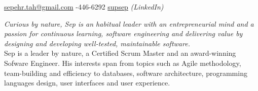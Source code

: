 \documentclass[10pt,a4paper]{article}
\begin{document}
\sloppy  %


\nobreakvspace{0.3em}  %

\noindent\href{mailto:sepehr.tah.at.gmail.dot.com}{sepehr.tah\mbox{}@\mbox{}gmail.com}\sbull
{}-446-6292\sbull
\href{http://www.linkedin.com/in/supsep}{supsep} \emph{(LinkedIn)}


\spacedhrule{0.9em}{-0.4em}  %


\vspace{-1.3em}  %
\begin{multicols}{2}  %
\emph{Curious by nature, Sep is an habitual leader with an entrepreneurial
mind and a passion for continuous learning, software engineering and delivering value
by designing and developing well-tested, maintainable software.} \\

Sep is a leader by nature, a Certified Scrum Master and an award-winning Sofware Engineer. His interests span from topics such as Agile methodology, team-building and efficiency to databases, software architecture, programming languages design, user interfaces and user experience.

\end{multicols}


\spacedhrule{0em}{-0.4em}

\end{document}
